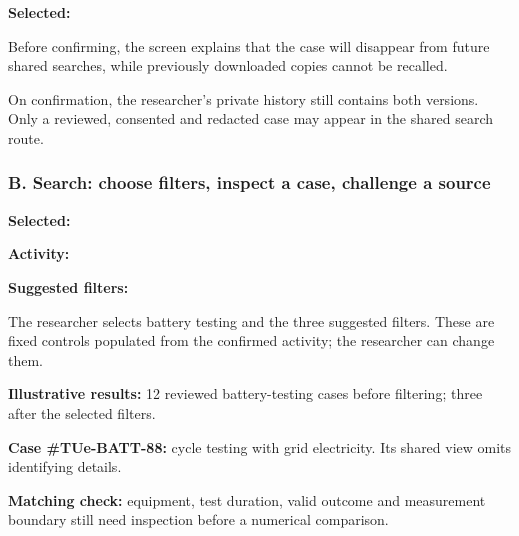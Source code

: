 \begin{queryscreen}
\textbf{Selected:} \par
Before confirming, the screen explains that the case will disappear from future shared searches, while previously downloaded copies cannot be recalled.\par\medskip
{}\quad
{}\par\medskip
On confirmation, the researcher's private history still contains both versions. Only a reviewed, consented and redacted case may appear in the shared search route.
\end{queryscreen}

\subsubsection*{B. Search: choose filters, inspect a case, challenge a source}
\begin{queryscreen}
\textbf{Selected:} \par
\textbf{Activity:} \quad
{}\quad
{}\par
\textbf{Suggested filters:} \quad
{}\quad
{}\par\medskip
The researcher selects battery testing and the three suggested filters. These are fixed controls populated from the confirmed activity; the researcher can change them.
\end{queryscreen}

\begin{queryscreen}
\textbf{Illustrative results:} 12 reviewed battery-testing cases before filtering; three after the selected filters.\par
\textbf{Case \#TUe-BATT-88:} cycle testing with grid electricity. Its shared view omits identifying details.\par
\textbf{Matching check:} equipment, test duration, valid outcome and measurement boundary still need inspection before a numerical comparison.\par\medskip
{}\quad
{}\quad
{}
\end{queryscreen}

